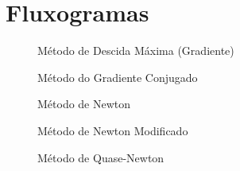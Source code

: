 \documentclass[a4paper,12pt,utf8x,notitlepage]{article}
\begin{document}
\section{Fluxogramas}

\begin{figure}[!hctb]
\centering
\scalebox{0.85}{}
\caption{Método de Descida Máxima (Gradiente)}
\label{fig:steep}
\end{figure}


\begin{figure}[!hctb]
\centering
\scalebox{0.85}{}
\caption{Método do Gradiente Conjugado}
\label{fig:grad_conj}
\end{figure}


\begin{figure}[!hct]
\centering
\scalebox{0.85}{}
\caption{Método de Newton}
\label{fig:newton_flux}
\end{figure}


\begin{figure}[!hctb]
\centering
\scalebox{0.85}{}
\caption{Método de Newton Modificado}
\label{fig:newton_mod_flux}
\end{figure}



\begin{figure}[!hctb]
\centering
\scalebox{0.85}{}
\caption{Método de Quase-Newton}
\label{fig:quasi_newton_flux}
\end{figure}
\end{document}
